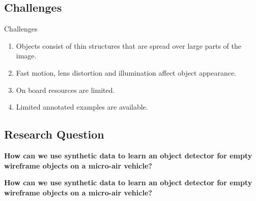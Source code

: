 \documentclass{beamer}
\begin{document}
\begin{darkframes}
\subsection{Challenges}    
\begin{frame}

\begin{block}{Challenges}
	\begin{enumerate}
		\item Objects consist of thin structures that are spread over large parts of the image.
		
		\item Fast motion, lens distortion and illumination affect object appearance.
		
		\item On board resources are limited.
		
		\item Limited annotated examples are available.
		
	\end{enumerate}
\end{block}
\end{frame}

	\subsection{Research Question}    
	\begin{frame}	
	\textbf{How can we use synthetic data to learn an object detector for empty wireframe objects on a micro-air vehicle?\\}
	\bigskip

	\centering
	\end{frame}
\begin{frame}	
\textbf{How can we use synthetic data to learn an object detector for empty wireframe objects on a micro-air vehicle?\\}
\bigskip


\end{frame}
\end{darkframes}
\end{document}
